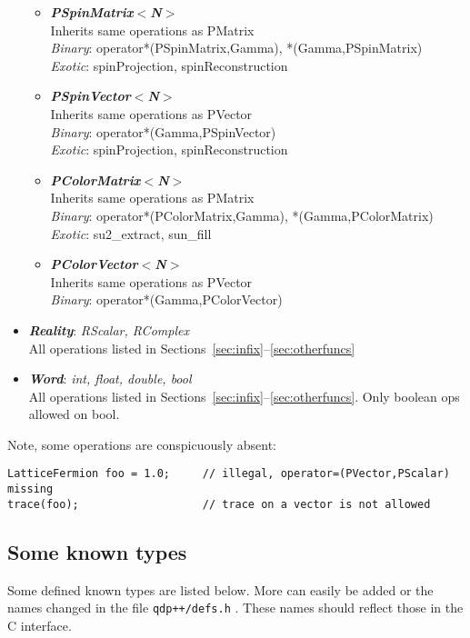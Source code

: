\documentclass[12pt,letterpaper]{article}
\begin{document}
\begin{itemize}
\begin{itemize}
\item
{\bf\em PSpinMatrix$<$N$>$}\\
  Inherits same operations as PMatrix\\
  {\em Binary}: operator*(PSpinMatrix,Gamma), *(Gamma,PSpinMatrix)\\
  {\em Exotic}: spinProjection, spinReconstruction

\item
{\bf\em PSpinVector$<$N$>$}\\
  Inherits same operations as PVector\\
  {\em Binary}: operator*(Gamma,PSpinVector)\\
  {\em Exotic}: spinProjection, spinReconstruction

\item
{\bf\em PColorMatrix$<$N$>$}\\
  Inherits same operations as PMatrix\\
  {\em Binary}: operator*(PColorMatrix,Gamma), *(Gamma,PColorMatrix)\\
  {\em Exotic}: su2\_extract, sun\_fill

\item
{\bf\em PColorVector$<$N$>$}\\
  Inherits same operations as PVector\\
  {\em Binary}: operator*(Gamma,PColorVector)

\end{itemize}  %

\item
{\bf\em Reality}: {\em RScalar, RComplex}\\
All operations listed in Sections~\ref{sec:infix}--\ref{sec:otherfuncs}

\item
{\bf\em Word}: {\em int, float, double, bool}\\
All operations listed in Sections~\ref{sec:infix}--\ref{sec:otherfuncs}.
Only boolean ops allowed on bool.


\end{itemize}  %


Note, some operations are conspicuously absent:
\begin{verbatim}
LatticeFermion foo = 1.0;     // illegal, operator=(PVector,PScalar) missing
trace(foo);                   // trace on a vector is not allowed
\end{verbatim}

\subsection{Some known types}
Some defined known types are listed below. More can easily be added or the
names changed in the file {\tt qdp++/defs.h} .
These names should reflect those in the C interface.
\end{document}
